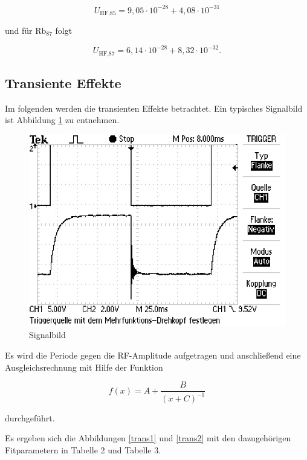 \begin{equation}
U_\text{HF,85} = 9,05 \cdot 10^{-28} + 4,08 \cdot 10^{-31}
\end{equation}

und für $\text{Rb}_{87}$ folgt

\begin{equation}
U_\text{HF,87} = 6,14 \cdot 10^{-28} + 8,32 \cdot 10^{-32}.
\end{equation}


\subsection{Transiente Effekte}
Im folgenden werden die transienten Effekte betrachtet. Ein typisches Signalbild ist Abbildung \ref{sigPic} zu entnehmen.

\begin{figure}[h]
\centering
\includegraphics[width=\textwidth]{img/TEK0019.JPG}
\caption{Signalbild}
\label{sigPic}
\end{figure}

Es wird die Periode gegen die RF-Amplitude aufgetragen und anschließend eine Ausgleichsrechnung mit Hilfe der Funktion

\begin{equation}
f(x) = A + \frac{B}{(x+C)^{-1}}
\end{equation}

durchgeführt.

Es ergeben sich die Abbildungen \ref{trans1} und \ref{trans2} mit den dazugehörigen Fitparametern in Tabelle 2 und Tabelle 3.

